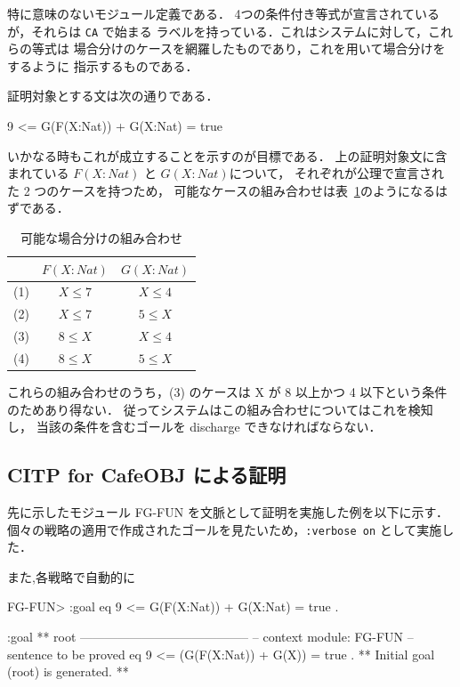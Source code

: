 \documentclass[a4paper,oneside,10pt,here]{memoir}
\newenvironment{vvtm}%
{\parskip=0pt\lineskip=0pt\begin{center}\begin{minipage}{0.8\textwidth}\begin{snugshade}}%
  {\end{snugshade}\end{minipage}\end{center}}
\begin{document}
特に意味のないモジュール定義である．
4つの条件付き等式が宣言されているが，それらは \texttt{CA} で始まる
ラベルを持っている．これはシステムに対して，これらの等式は
場合分けのケースを網羅したものであり，これを用いて場合分けをするように
指示するものである．

証明対象とする文は次の通りである．
\begin{vvtm}
  \begin{simplev}
9 <= G(F(X:Nat)) + G(X:Nat) = true
  \end{simplev}
\end{vvtm}
いかなる時もこれが成立することを示すのが目標である．
上の証明対象文に含まれている $F(X:Nat)$ と $G(X:Nat)$について， 
それぞれが公理で宣言された 2 つのケースを持つため，
可能なケースの組み合わせは表~\ref{tab:cases}のようになるはずである．
\begin{table}
\label{tab:cases}
\caption{可能な場合分けの組み合わせ}
\begin{center}
\begin{tabular}[htb]{|c|c|c|}\hline
&$F(X:Nat)$ & $G(X:Nat)$ \\\hline
(1)&$X \le 7$ & $X \le 4$ \\
(2)&$X \le 7$ & $5 \le X$ \\
(3)&$8 \le X$ & $X \le 4$ \\
(4)&$8 \le X$ & $5 \le X$ \\\hline 
\end{tabular}
\end{center}
\end{table}

これらの組み合わせのうち，(3) のケースは
X が 8 以上かつ 4 以下という条件のためあり得ない．
従ってシステムはこの組み合わせについてはこれを検知し，
当該の条件を含むゴールを discharge できなければならない．

\subsection{CITP for CafeOBJ による証明}

先に示したモジュール FG-FUN を文脈として証明を実施した例を以下に示す．
個々の戦略の適用で作成されたゴールを見たいため，\verb|:verbose on| として実施した．

また,各戦略で自動的に

\begin{vvtm}
  \begin{simplev}
FG-FUN> :goal { eq 9 <= G(F(X:Nat)) + G(X:Nat) = true . }

:goal { ** root -----------------------------------------
  -- context module: FG-FUN
  -- sentence to be proved
    eq 9 <= (G(F(X:Nat)) + G(X)) = true .
}
** Initial goal (root) is generated. **
  \end{simplev}
\end{vvtm}
\end{document}
